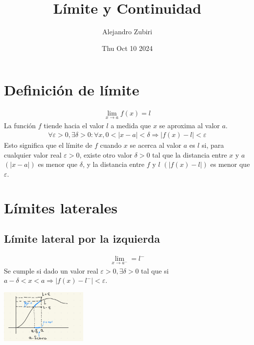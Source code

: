 \documentclass{article}
\author{Alejandro Zubiri}
\date{Thu Oct 10 2024}
\title{Límite y Continuidad}
\begin{document}
\maketitle
\tableofcontents
\pagebreak
\section{Definición de límite}
\begin{equation}
    \begin{split}
        \lim_{x \to a} f(x)=l
    \end{split}
\end{equation}
La función $f$ tiende hacia el valor $l$ a medida que $x$ se aproxima al valor $a$.\\
\begin{equation}
    \begin{split}
        \forall \varepsilon>0, \exists \delta > 0 : \forall x, 0<|x-a|<\delta\Rightarrow |f(x)-l|<\varepsilon
    \end{split}
\end{equation}
Esto significa que el límite de $f$ cuando $x$ se acerca al valor $a$ es $l$ si, para cualquier valor real $\varepsilon>0$,
existe otro valor $\delta>0$ tal que la distancia entre $x$ y $a$ $(|x-a|)$ es menor que $\delta$, y la distancia
entre $f$ y $l$ $(|f(x)-l|)$ es menor que $\varepsilon$.
\section{Límites laterales}
\subsection{Límite lateral por la izquierda}
\begin{equation}
    \begin{split}
        \lim_{x \to a^{-}}= l^{-}
    \end{split}
\end{equation}
Se cumple si dado un valor real $\varepsilon>0,\exists \delta>0$ tal que si $a-\delta<x<a\Rightarrow |f(x)-l^-|<\varepsilon$.\\
\begin{center}
    \includegraphics[height =100px]{limIzquierda.jpg}
\end{center}
\end{document}

